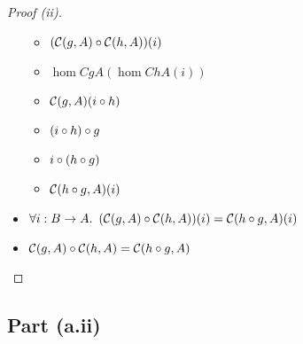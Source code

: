 \begin{prop}
\begin{proof}[Proof (ii)]
\begin{itemize}
\begin{itemize}
          \item[\phs]
            $(\mathcal{C}(g, A)\circ\mathcal{C}(h, A))(i)$

          \item[\eqs] $\hom{C}{g}{A}(\hom{C}{h}{A}(i))$
            \marginnote{\Def-$\compose$}

          \item[\eqs] $\mathcal{C}(g, A)(i\circ h)$
            \marginnote{\Def-\ref{def:contra-hom}}

          \item[\eqs] $(i\circ h)\circ g$
            \marginnote{\Def-\ref{def:contra-hom}}

          \item[\eqs] $i\circ (h\circ g)$
            \marginnote{\Assoc-$\compose$}

          \item[\eqs] $\mathcal{C}(h\circ g, A)(i)$
            \marginnote{\Def-\ref{def:contra-hom}}
        \end{itemize}

      \item[\imps]
        $\forall i : B\to A\ldotp~(\mathcal{C}(g, A)\circ\mathcal{C}(h, A))(i) = \mathcal{C}(h\circ g, A)(i)$
        \marginnote{$\forall$-\Intro-$\star$}

      \item[\iffs]
        $\mathcal{C}(g, A)\circ\mathcal{C}(h, A) = \mathcal{C}(h\circ g, A)$
        \marginnote{\Def-$=$}
        \qedhere
    \end{itemize}
  \end{proof}
\end{prop}

\subsection{Part (a.ii)}\label{sec:q-1-a-ii}


